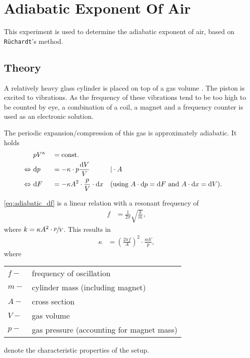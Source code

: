 \chapter{Adiabatic Exponent Of Air}
This experiment is used to determine the adiabatic exponent of air, based on \texttt{Rüchardt}'s method.

\section{Theory}
A relatively heavy glass cylinder is placed on top of a gas volume .
The piston is excited to vibrations.
As the frequency of these vibrations tend to be too high to be counted by eye, a combination of a coil, a magnet and a frequency counter is used as an electronic solution.

The periodic expansion/compression of this gas is approximately adiabatic. It holds
\begin{align}
	&pV^{\kappa} &&= \text{const.}& \nonumber \\
	\Leftrightarrow\ &\text{d} p &&= -\kappa\cdot p\frac{\text{d} V}{V}&&|\cdot A \nonumber \\
	\Leftrightarrow\ &\text{d} F &&= -\kappa A^2\cdot\frac{p}{V}\cdot\text{d} x &&\text{(using $A\cdot \text{d} p=\text{d} F$ and $A\cdot\text{d} x=\text{d} V$).} \label{eq:adiabatic_df}
\end{align}

\autoref{eq:adiabatic_df} is a linear relation with a resonant frequency of
\begin{align*}
	f&=\frac{1}{2\pi}\sqrt{\frac{k}{m}},
\end{align*}
where $k=\kappa A^2\cdot\sfrac{p}{V}$.
This results in
\begin{align}\label{eq:kappa}
	\kappa&=\left(\frac{2\pi f}{A}\right)^2\cdot\frac{mV}{p},
\end{align}
where\par
\begin{tabular}{ll}
	$f-$	&	frequency of oscillation \\
	$m-$	&	cylinder mass (including magnet) \\
	$A-$	&	cross section \\
	$V-$	&	gas volume \\
	$p-$	&	gas pressure (accounting for magnet mass)\\
\end{tabular}\par
denote the characteristic properties of the setup.

